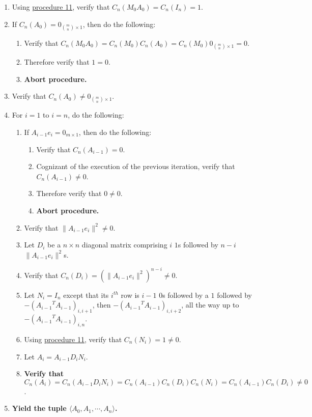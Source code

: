 \documentclass[twocolumn]{article}
\begin{document}
				\begin{enumerate}
					\item Using \hyperref[sec:procedure 11]{procedure 11}, verify that $C_n(M_0A_0)=C_n(I_n)=1$.
					\item If $C_n(A_0)=0_{\binom{m}{n}\times 1}$, then do the following:
					\begin{enumerate}
						\item Verify that $C_n(M_0A_0)=C_n(M_0)C_n(A_0)=C_n(M_0)0_{\binom{m}{n}\times 1}=0$.
						\item Therefore verify that $1=0$.
						\item \textbf{Abort procedure.}
					\end{enumerate}
					\item Verify that $C_n(A_0)\ne0_{\binom{m}{n}\times 1}$.
					\item For $i=1$ to $i=n$, do the following:
					\begin{enumerate}
						\item If $A_{i-1}e_i=0_{m\times 1}$, then do the following:
						\begin{enumerate}
							\item Verify that $C_n(A_{i-1})=0$.
							\item Cognizant of the execution of the previous iteration, verify that $C_n(A_{i-1})\ne 0$.
							\item Therefore verify that $0\ne 0$.
							\item \textbf{Abort procedure.}
						\end{enumerate}
						\item Verify that $\lVert A_{i-1}e_i\rVert^2\ne 0$.
						\item Let $D_i$ be a $n\times n$ diagonal matrix comprising $i$ $1$s followed by $n-i$ $\lVert A_{i-1}e_i\rVert^2$s.
						\item Verify that $C_n(D_i)=(\lVert A_{i-1}e_i\rVert^2)^{n-i}\ne 0$.
						\item Let $N_i=I_n$ except that its $i^{th}$ row is $i-1$ $0$s followed by a $1$ followed by $-({A_{i-1}}^TA_{i-1})_{i,i+1}$, then $-({A_{i-1}}^TA_{i-1})_{i,i+2}$, all the way up to $-({A_{i-1}}^TA_{i-1})_{i,n}$.
						\item Using \hyperref[sec:procedure 11]{procedure 11}, verify that $C_n(N_i)=1\ne 0$.
						\item Let $A_i=A_{i-1}D_iN_i$.
						\item \textbf{Verify that $C_n(A_i)=C_n(A_{i-1}D_iN_i)=C_n(A_{i-1})C_n(D_i)C_n(N_i)=C_n(A_{i-1})C_n(D_i)\ne 0$}.
					\end{enumerate}
					\item \textbf{Yield the tuple $\langle A_0,A_1,\cdots,A_n\rangle$.}
				\end{enumerate}
\end{document}
